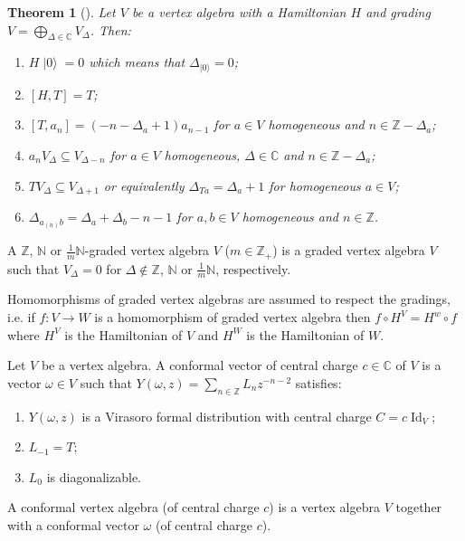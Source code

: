 \documentclass[a4paper, 12pt, reqno]{amsart}
\newtheorem{theorem}{Theorem}[subsection]
\theoremstyle{remark}
\numberwithin{equation}{subsection}
\DeclareMathOperator{\Id}{Id}
\DeclareMathOperator{\vac}{|0\rangle}
\begin{document}
\begin{theorem}[{\cite[\S4.9]{kac_vertex_1998}}]
  \label{thr:17}
  Let $V$ be a vertex algebra with a Hamiltonian $H$ and grading $V = \bigoplus_{\Delta \in \mathbb{C}}V_{\Delta}$.
  Then:
  \begin{enumerate}
  \item $H\vac = 0$ which means that $\Delta_{\vac} = 0$;
  \item $[H, T] = T$;
  \item $[T, a_n] = (-n - \Delta_a + 1)a_{n - 1}$ for $a \in V$ homogeneous and $n \in \mathbb{Z} - \Delta_a$;
  \item $a_nV_{\Delta} \subseteq V_{\Delta - n}$ for $a \in V$ homogeneous, $\Delta \in \mathbb{C}$ and $n \in \mathbb{Z} - \Delta_a$;
  \item $TV_\Delta \subseteq V_{\Delta + 1}$ or equivalently $\Delta_{Ta} = \Delta_a + 1$ for homogeneous $a \in V$;
  \item $\Delta_{a_{(n)}b} = \Delta_a + \Delta_b - n - 1$ for $a, b \in V$ homogeneous and $n \in \mathbb{Z}$.
  \end{enumerate}
\end{theorem}

A $\mathbb{Z}$, $\mathbb{N}$ or $\frac{1}{m}\mathbb{N}$-graded vertex algebra $V$ ($m \in \mathbb{Z}_+$) is a graded vertex algebra $V$ such that $V_{\Delta} = 0$ for $\Delta \notin \mathbb{Z}$, $\mathbb{N}$ or $\frac{1}{m}\mathbb{N}$, respectively.

Homomorphisms of graded vertex algebras are assumed to respect the gradings, i.e. if $f: V \to W$ is a homomorphism of graded vertex algebra then $f\circ H^V = H^w\circ f$ where $H^V$ is the Hamiltonian of $V$ and $H^W$ is the Hamiltonian of $W$.

Let $V$ be a vertex algebra.
A conformal vector of central charge $c \in \mathbb{C}$ of $V$ is a vector $\omega \in V$ such that $Y(\omega, z) = \sum_{n \in \mathbb{Z}}L_nz^{-n - 2}$ satisfies:
\begin{enumerate}
\item $Y(\omega, z)$ is a Virasoro formal distribution with central charge $C = c\Id_V$;
\item $L_{-1} = T$;
\item $L_0$ is diagonalizable. 
\end{enumerate}

A conformal vertex algebra (of central charge $c$) is a vertex algebra $V$ together with a conformal vector $\omega$ (of central charge $c$).
\end{document}
